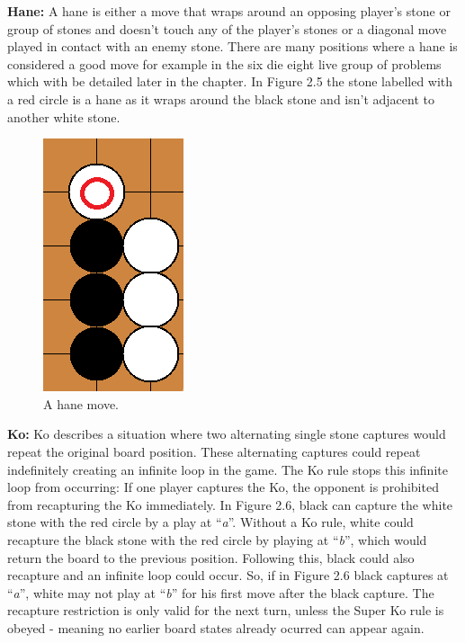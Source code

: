 \documentclass{l3proj}
\begin{document}
\textbf{Hane:} A hane is either a move that wraps around an opposing player's stone or group of stones and doesn’t touch any of the player’s stones or a diagonal move played in contact with an enemy stone. There are many positions where a hane is considered a good move for example in the six die eight live group of problems which with be detailed later in the chapter. In Figure 2.5 the stone labelled with a red circle is a hane as it wraps around the black stone and isn’t adjacent to another white stone.

\begin{figure}[H]
\centering
\includegraphics[scale=0.5]{Images/ahane.png}
\caption{A hane move.}
\end{figure}

\textbf{Ko:} Ko describes a situation where two alternating single stone captures would repeat the original board position. These alternating captures could repeat indefinitely creating an infinite loop in the game. The Ko rule stops this infinite loop from occurring: If one player captures the Ko, the opponent is prohibited from recapturing the Ko immediately. In Figure 2.6, black can capture the white stone with the red circle by a play at “\textit{a}”. Without a Ko rule, white could recapture the black stone with the red circle by playing at “\textit{b}”, which would return the board to the previous position. Following this, black could also recapture and an infinite loop could occur. So, if in Figure 2.6 black captures at “\textit{a}”, white may not play at “\textit{b}” for his first move after the black capture. The recapture restriction is only valid for the next turn, unless the Super Ko rule is obeyed - meaning no earlier board states already ocurred can appear again.
\end{document}
